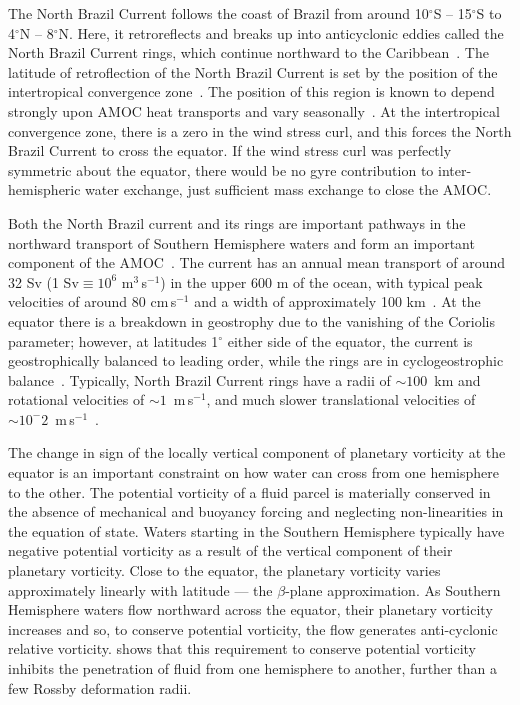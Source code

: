 The North Brazil Current follows the coast of Brazil from around 10$^\circ$S -- 15$^\circ$S to 4$^\circ$N -- 8$^\circ$N. Here, it retroreflects and breaks up into anticyclonic eddies called the North Brazil Current rings, which continue northward to the Caribbean~\citep{Talley2011AtlOce}. The latitude of retroflection of the North Brazil Current is set by the position of the intertropical convergence zone~\citep{Fonseca2004}. The position of this region is known to depend strongly upon AMOC heat transports and vary seasonally~\citep{Zhang2005, Fuckar2013}. At the intertropical convergence zone, there is a zero in the wind stress curl, and this forces the North Brazil Current to cross the equator. If the wind stress curl was perfectly symmetric about the equator, there would be no gyre contribution to inter-hemispheric water exchange, just sufficient mass exchange to close the AMOC.

Both the North Brazil current and its rings are important pathways in the northward transport of Southern Hemisphere waters and form an important component of the AMOC~\citep{Bower2019}. The current has an annual mean transport of around 32 Sv (1 Sv$\equiv 10^{6}$ m$^3$\,s$^{-1}$) in the upper 600 m of the ocean, with typical peak velocities of around 80 cm\,s$^{-1}$ and a width of approximately 100 km~\citep{Johns1998, Schott1993}. At the equator there is a breakdown in geostrophy due to the vanishing of the Coriolis parameter; however, at latitudes 1$^\circ$ either side of the equator, the current is geostrophically balanced to leading order, while the rings are in cyclogeostrophic balance~\citep{Vianna2003, Castelao2011}. Typically, North Brazil Current rings have a radii of $\sim 100$~km and rotational velocities of $\sim 1$~m\,s$^{-1}$, and much slower translational velocities of $\sim 10^-2$~m\,s$^{-1}$~\citep{Castelao2011}.

The change in sign of the locally vertical component of planetary vorticity at the equator is an important constraint on how water can cross from one hemisphere to the other. The potential vorticity of a fluid parcel is materially conserved in the absence of mechanical and buoyancy forcing and neglecting non-linearities in the equation of state. Waters starting in the Southern Hemisphere typically have negative potential vorticity as a result of the vertical component of their planetary vorticity. Close to the equator, the planetary vorticity varies approximately linearly with latitude --- the $\beta$-plane approximation. As Southern Hemisphere waters flow northward across the equator, their planetary vorticity increases and so, to conserve potential vorticity, the flow generates anti-cyclonic relative vorticity. \citet{Killworth1991} shows that this requirement to conserve potential vorticity inhibits the penetration of fluid from one hemisphere to another, further than a few Rossby deformation radii.

